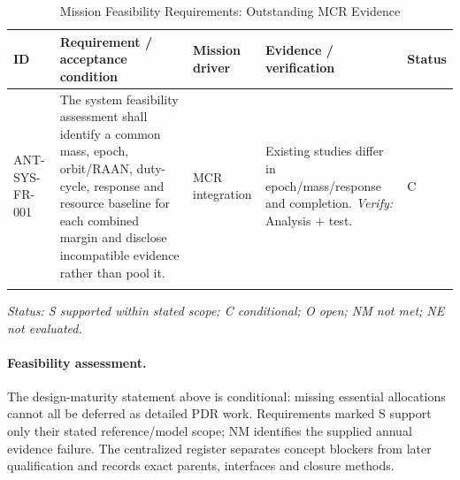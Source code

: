 \begin{table}[H]\centering\small\setlength{\tabcolsep}{3pt}
\caption{Mission Feasibility Requirements: Outstanding MCR Evidence}\label{tab:fr-sys}
\begin{tabular}{@{}
>{\RaggedRight\arraybackslash}p{}
>{\RaggedRight\arraybackslash}p{}
>{\RaggedRight\arraybackslash}p{}
>{\RaggedRight\arraybackslash}p{}
>{\RaggedRight\arraybackslash}p{}
@{}}
\toprule ID & Requirement / acceptance condition & Mission driver & Evidence / verification & Status\\\midrule
{}\label{req:ANT-SYS-FR-001}\mbox{ANT-SYS-}\newline\mbox{FR-001} & The system feasibility assessment shall identify a common mass, epoch, orbit/RAAN, duty-cycle, response and resource baseline for each combined margin and disclose incompatible evidence rather than pool it. & MCR integration & Existing studies differ in epoch/mass/response and completion. \emph{Verify:} Analysis + test. & C\\
\addlinespace[3pt]
\bottomrule
\end{tabular}
\end{table}
\textit{Status: S supported within stated scope; C conditional; O open; NM not met; NE not evaluated.}
\paragraph{Feasibility assessment.} The design-maturity statement above is conditional: missing essential allocations cannot all be deferred as detailed PDR work. Requirements marked S support only their stated reference/model scope; NM identifies the supplied annual evidence failure. The centralized register separates concept blockers from later qualification and records exact parents, interfaces and closure methods.
